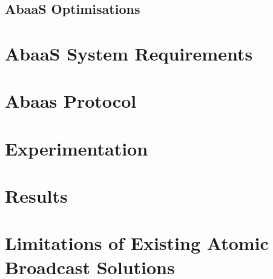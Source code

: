 	\subsection{AbaaS Optimisations}


\section{AbaaS System Requirements}
		

\section{Abaas Protocol}

\section{Experimentation}

\section{Results}

\section{Limitations of Existing Atomic Broadcast Solutions}
